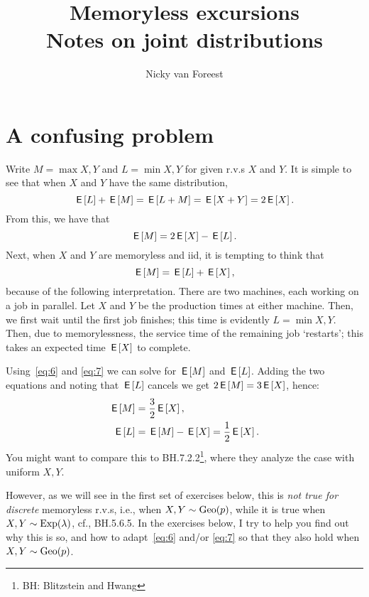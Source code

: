 \documentclass[a4paper,11pt]{article}
\title{Memoryless excursions\\
Notes on joint distributions }
\author{Nicky van Foreest}
\begin{document}
\maketitle
\tableofcontents



\section{A confusing problem}
\label{sec:confusing-problem}

Write $M=\max{X,Y}$ and $L=\min{X,Y}$ for given r.v.s $X$ and $Y$.
It is simple to see that when $X$ and $Y$  have the same distribution, 
\begin{equation}
\,\mathsf{E}\left[L\right] + \,\mathsf{E}\left[M\right] = \,\mathsf{E}\left[L+M\right]=\,\mathsf{E}\left[X+Y\right] = 2\,\mathsf{E}\left[X\right].
\end{equation}
From this, we have that 
\begin{equation}
  \label{eq:6}
\,\mathsf{E}\left[M\right] = 2\,\mathsf{E}\left[X\right] - \,\mathsf{E}\left[L\right].
\end{equation}
Next, when $X$ and $Y$ are memoryless and iid, it is  tempting to think that
\begin{equation}
  \label{eq:7}
\,\mathsf{E}\left[M\right] = \,\mathsf{E}\left[L\right]  + \,\mathsf{E}\left[X\right],
\end{equation}
because of  the following interpretation.
There are two machines, each working on a job in parallel.
Let $X$ and $Y$ be the production times at either machine.
Then, we first wait until the first job finishes; this time is evidently $L=\min{X, Y}$.
Then, due to memorylessness, the service time of the remaining job `restarts'; this takes an expected time $\,\mathsf{E}\left[X\right]$ to complete.

Using~\cref{eq:6} and \cref{eq:7}  we can solve for $\,\mathsf{E}\left[M\right]$ and $\,\mathsf{E}\left[L\right]$.
Adding the two equations and noting that $\,\mathsf{E}\left[L\right]$ cancels we get $2\,\mathsf{E}\left[M\right] = 3 \,\mathsf{E}\left[X\right] $, hence:
\begin{align}
\,\mathsf{E}\left[M\right] &= \frac 3 2 \,\mathsf{E}\left[X\right],\label{eq:35}\\
\,\mathsf{E}\left[L\right] &= \,\mathsf{E}\left[M\right] - \,\mathsf{E}\left[X\right] = \frac 1 2 \,\mathsf{E}\left[X\right].\label{eq:36}
\end{align}
You might want to compare this to BH.7.2.2\footnote{BH: Blitzstein and Hwang}, where they analyze the case with uniform $X, Y$.

However, as we will see in the first set of exercises below, this is \emph{ not true for discrete} memoryless r.v.s, i.e., when $X, Y \sim \mathrm{Geo}(p)$, while it is true when $X, Y \sim \mathrm{Exp}(\lambda)$, cf., BH.5.6.5.
In the exercises below, I try to help you find out why this is so, and how to adapt~\cref{eq:6} and/or \cref{eq:7} so that they also hold when $X,Y\sim\mathrm{Geo}(p)$.
\end{document}
